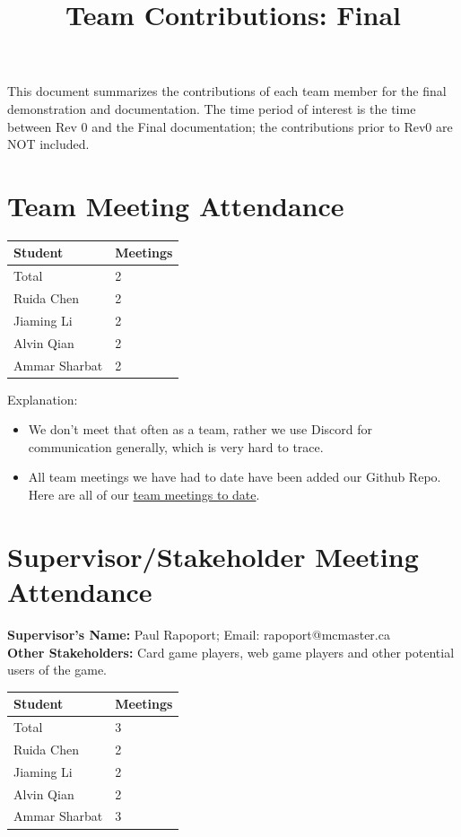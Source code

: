 \documentclass{article}
\title{Team Contributions: Final\\\progname}
\author{\authname}
\date{}
\begin{document}
\maketitle

This document summarizes the contributions of each team member for the final
demonstration and documentation.  The time period of interest is the time
between Rev 0 and the Final documentation; the contributions prior to Rev0 are
NOT included.

\section{Team Meeting Attendance}

\begin{table}[H]
\centering
\begin{tabular}{ll}
\toprule
\textbf{Student} & \textbf{Meetings}\\
\midrule
Total & 2 \\
Ruida Chen & 2 \\
Jiaming Li & 2 \\
Alvin Qian & 2 \\
Ammar Sharbat & 2 \\
\bottomrule
\end{tabular}
\end{table}

Explanation:
\begin{itemize}
    \item We don't meet that often as a team, rather we use Discord for communication generally, which is very hard to trace.
    \item All team meetings we have had to date have been added our Github Repo. Here are all of our \href{https://github.com/The-Crazy-Four-Games/Crazy_1-0s_Game/issues?q=is%3Aissue%20team%20meeting}{team meetings to date}.
\end{itemize}

\section{Supervisor/Stakeholder Meeting Attendance}

\noindent \textbf{Supervisor's Name: } Paul Rapoport; Email: rapoport@mcmaster.ca\\
\noindent \textbf{Other Stakeholders: } Card game players, web game players and other potential users of the game.

\begin{table}[H]
\centering
\begin{tabular}{ll}
\toprule
\textbf{Student} & \textbf{Meetings}\\
\midrule
Total & 3 \\
Ruida Chen & 2 \\
Jiaming Li & 2 \\
Alvin Qian & 2 \\
Ammar Sharbat & 3 \\
\bottomrule
\end{tabular}
\end{table}
\end{document}
